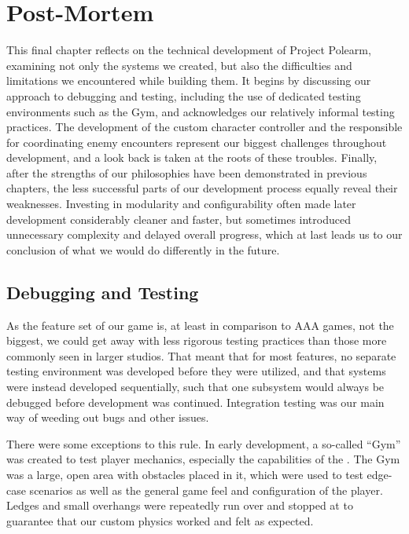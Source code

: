 \documentclass[../Main.tex]{subfiles}
\begin{document}
\section{Post-Mortem}\label{sec:post-mortem}

This final chapter reflects on the technical development of Project Polearm, examining not only the systems we created, but also the difficulties and limitations we encountered while building them. It begins by discussing our approach to debugging and testing, including the use of dedicated testing environments such as the Gym, and acknowledges our relatively informal testing practices. The development of the custom  character controller and the  responsible for coordinating enemy encounters represent our biggest challenges throughout development, and a look back is taken at the roots of these troubles. Finally, after the strengths of our philosophies have been demonstrated in previous chapters, the less successful parts of our development process equally reveal their weaknesses. Investing in modularity and configurability often made later development considerably cleaner and faster, but sometimes introduced unnecessary complexity and delayed overall progress, which at last leads us to our conclusion of what we would do differently in the future.

\subsection{Debugging and Testing}\label{sec:debugging-and-testing}

As the feature set of our game is, at least in comparison to AAA games, not the biggest, we could get away with less rigorous testing practices than those more commonly seen in larger studios. That meant that for most features, no separate testing environment was developed before they were utilized, and that systems were instead developed sequentially, such that one subsystem would always be debugged before development was continued. Integration testing was our main way of weeding out bugs and other issues.

There were some exceptions to this rule. In early development, a so-called \enquote{Gym} was created to test player mechanics, especially the capabilities of the . The Gym was a large, open area with obstacles placed in it, which were used to test edge-case scenarios as well as the general game feel and configuration of the player. Ledges and small overhangs were repeatedly run over and stopped at to guarantee that our custom physics worked and felt as expected.
\end{document}
